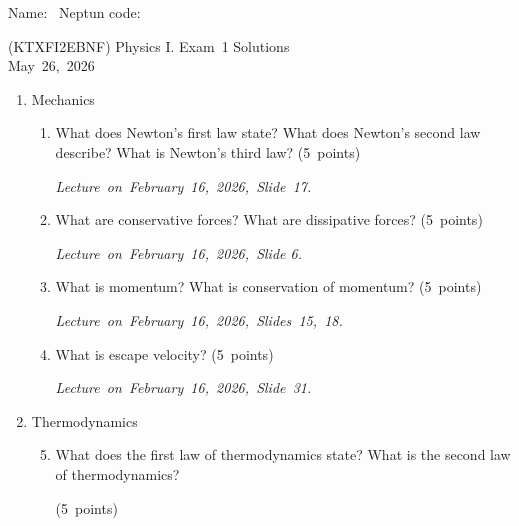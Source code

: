 \documentclass[a4paper,12pt]{letter}
\begin{document}
Name: \hrulefill\ Neptun code: \hrulefill

\bigskip

\begin{center}
(KTXFI2EBNF) Physics I. Exam~1 Solutions\\
May~26,~2026
\end{center}

\bigskip
 
\begin{enumerate}[label=\Roman*.]
   
\item Mechanics

\begin{enumerate}[label=\arabic*.]
\setcounter{enumii}{0} %

\item What does Newton’s first law state? What does Newton’s second law describe? What is Newton’s third law? \hfill (5~points)

\smallskip
\textit{Lecture~on~February~16,~2026,~Slide~17.}

\item What are conservative forces? What are dissipative forces? \hfill (5~points)

\smallskip
\textit{Lecture~on~February~16,~2026,~Slide 6.}

\item What is momentum? What is conservation of momentum? \hfill (5~points)

\smallskip
\textit{Lecture~on~February~16,~2026,~Slides~15,~18.}

\item What is escape velocity? \hfill (5~points)

\smallskip
\textit{Lecture~on~February~16,~2026,~Slide~31.}
  
\end{enumerate}


\item Thermodynamics

\begin{enumerate}[label=\arabic*.]
\setcounter{enumii}{4} %

\item What does the first law of thermodynamics state? What is the second law of thermodynamics?

\hfill (5~points)


\end{enumerate}
\end{enumerate}
\end{document}
